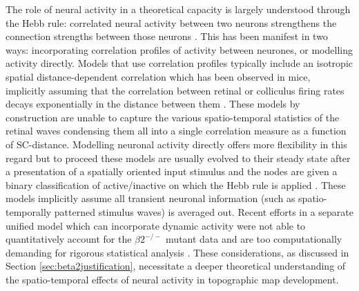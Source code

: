The role of neural activity in a theoretical capacity is largely understood through the Hebb rule: correlated neural activity between two neurons strengthens the connection strengths between those neurons \cite{Hebb1949-wr}. This has been manifest in two ways: incorporating correlation profiles of activity between neurones, or modelling activity directly. Models that use correlation profiles typically include an isotropic spatial distance-dependent correlation which has been observed in mice, implicitly assuming that the correlation between retinal or colliculus firing rates decays exponentially in the distance between them \cite{Hjorth2015-le, Triplett2011-jk, Stafford2009}. These models by construction are unable to capture the various spatio-temporal statistics of the retinal waves condensing them all into a single correlation measure as a function of SC-distance. Modelling neuronal activity directly offers more flexibility in this regard but to proceed these models are usually evolved to their steady state after a presentation of a spatially oriented input stimulus and the nodes are given a binary classification of active/inactive on which the Hebb rule is applied  \cite{Willshaw1976-ew, Kohonen1982-nd, Stevens2013-ly, Takeuchi1979-zy, Detorakis2012-eh}. These models implicitly assume all transient neuronal information (such as spatio-temporally patterned stimulus waves) is averaged out. Recent efforts in a separate unified model which can incorporate dynamic activity were not able to quantitatively account for the $\beta2^{-/-}$ mutant data and are too computationally demanding for rigorous statistical analysis \cite{Godfrey2009-ts}. These considerations, as discussed in Section \ref{sec:beta2justification}, necessitate a deeper theoretical understanding of the spatio-temporal effects of neural activity in topographic map development.

